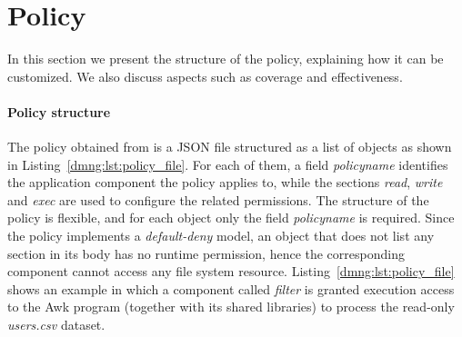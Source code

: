 \section{Policy}\label{dmng:sect:policy}

In this section we present the structure of the policy, explaining how
it can be customized. We also discuss aspects such as coverage and
effectiveness.

\paragraph*{Policy structure} The policy obtained from \dmng is a JSON
file structured as a list of objects as shown in
Listing~\ref{dmng:lst:policy_file}. For each of them, a field {\em
  policy\textunderscore name} identifies the application component the
policy applies to, while the sections {\em read}, {\em write} and {\em
  exec} are used to configure the related permissions. The structure
of the policy is flexible, and for each object only the field {\em
  policy\textunderscore name} is required. Since the policy implements
a \mbox{{\em default-deny}} model, an object that does not list any
section in its body has no runtime permission, hence the corresponding
component cannot access any file system
resource. Listing~\ref{dmng:lst:policy_file} shows an example in which a
component called {\em filter} is granted execution access to the Awk
program (together with its shared libraries) to process the
\mbox{read-only} {\em users.csv} dataset.

